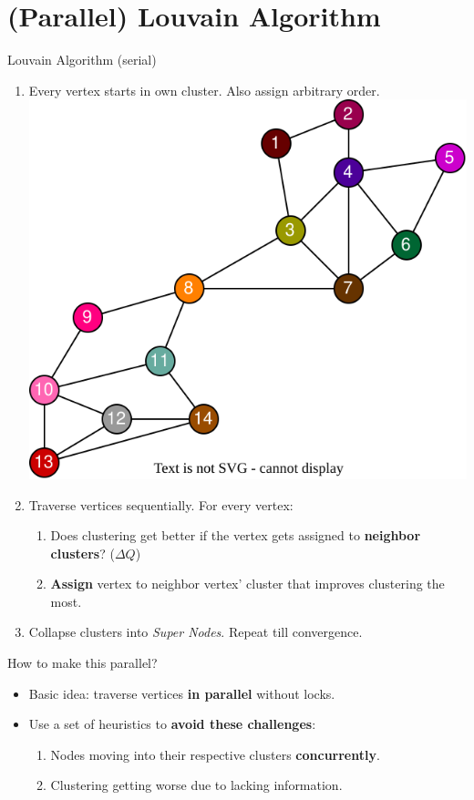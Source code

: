 \section{(Parallel) Louvain Algorithm}

\begin{frame}{Louvain Algorithm (serial)}{}
\begin{enumerate}
 \item<1-> Every vertex starts in own cluster. Also assign arbitrary order.
 \includegraphics[scale=0.45]{220523_distparallel_louvainstart.drawio.svg}
 \item<2-> Traverse vertices sequentially. For every vertex:
 \begin{enumerate}
   \item<3-> Does clustering get better if the vertex gets assigned to \textbf{neighbor clusters}? ($\Delta Q$)
   \item<4-> \textbf{Assign} vertex to neighbor vertex' cluster that improves clustering the most.
 \end{enumerate}
 \item<5-> Collapse clusters into \emph{Super Nodes}. Repeat till convergence.
\end{enumerate}
\end{frame}

\begin{frame}{How to make this parallel?}
  \begin{itemize}
    \item<1-> Basic idea: traverse vertices \textbf{in parallel} without locks.
    \item<2-> Use a set of heuristics to \textbf{avoid these challenges}:
    \begin{enumerate}
      \item<3-> Nodes moving into their respective clusters \textbf{concurrently}.
      \item<4-> Clustering getting worse due to lacking information.
    \end{enumerate}
  \end{itemize}
\end{frame}

